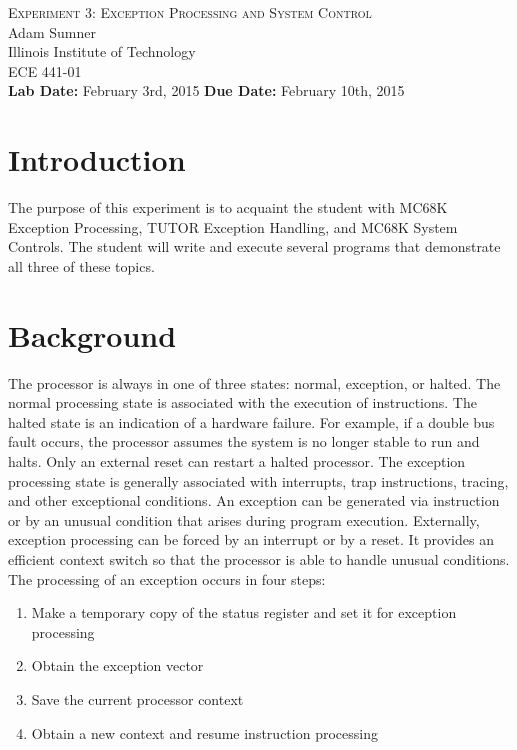\documentclass[12pt, twocolumn]{article}
\begin{document}
\begin{titlepage}
	\begin{center}
		
		
		\vfill
		
		\textsc{\LARGE Experiment 3: Exception Processing and System Control}\\[1.5cm]
		
		\Large Adam Sumner\\[0.5cm]
		
		\Large Illinois Institute of Technology\\[0.5cm]
		
		\Large ECE 441-01\\[0.5cm]	
		\noindent
		\vfill
		\large \textbf{Lab Date:} February 3rd, 2015\hfill
		\large \textbf{Due Date:} February 10th, 2015
		
		
	\end{center}
\end{titlepage}

\section{Introduction}
The purpose of this experiment is to acquaint the student with MC68K Exception Processing, TUTOR Exception Handling, and MC68K System Controls. The student will write and execute several programs that demonstrate all three of these topics.
\section{Background}
The processor is always in one of three states: normal, exception, or halted. The normal processing state is associated with the execution of instructions. The halted state is an indication of a hardware failure. For example, if a double bus fault occurs, the processor assumes the system is no longer stable to run and halts. Only an external reset can restart a halted processor. The exception processing state is generally associated with interrupts, trap instructions, tracing, and other exceptional conditions. An exception can be generated via instruction or by an unusual condition that arises during program execution. Externally, exception processing can be forced by an interrupt or by a reset. It provides an efficient context switch so that the processor is able to handle unusual conditions\cite{m68k}. The processing of an exception occurs in four steps:
\begin{enumerate}
	\item Make a temporary copy of the status register and set it for exception processing
	\item Obtain the exception vector
	\item Save the current processor context
	\item Obtain a new context and resume instruction processing
\end{enumerate}
\end{document}
